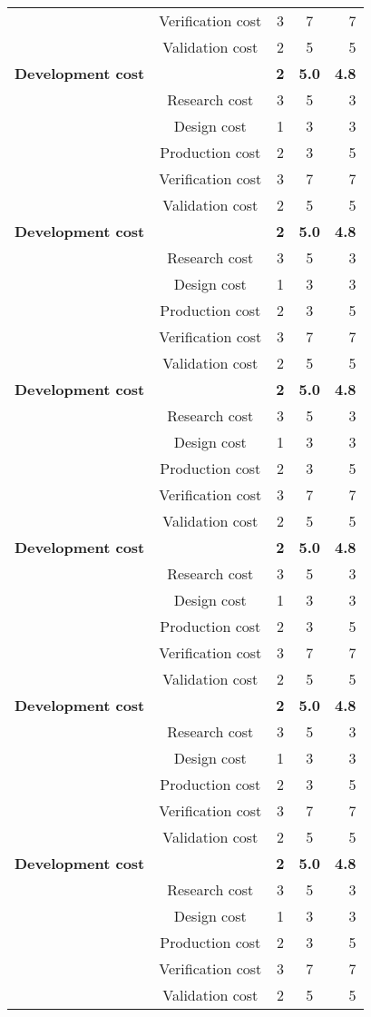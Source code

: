 \begin{center}
\begin{scriptsize}
\begin{longtable}[c]{lcccr}
  & Verification cost & 3 & 7 & 7 \\
  & Validation cost & 2 & 5 & 5 \\
  \textbf{Development cost} & & \textbf{2} & \textbf{5.0} & \textbf{4.8} \\
  & Research cost & 3 & 5 & 3 \\
  & Design cost & 1 & 3 & 3 \\
  & Production cost & 2 & 3 & 5 \\
  & Verification cost & 3 & 7 & 7 \\
  & Validation cost & 2 & 5 & 5 \\
  \textbf{Development cost} & & \textbf{2} & \textbf{5.0} & \textbf{4.8} \\
  & Research cost & 3 & 5 & 3 \\
  & Design cost & 1 & 3 & 3 \\
  & Production cost & 2 & 3 & 5 \\
  & Verification cost & 3 & 7 & 7 \\
  & Validation cost & 2 & 5 & 5 \\
  \textbf{Development cost} & & \textbf{2} & \textbf{5.0} & \textbf{4.8} \\
  & Research cost & 3 & 5 & 3 \\
  & Design cost & 1 & 3 & 3 \\
  & Production cost & 2 & 3 & 5 \\
  & Verification cost & 3 & 7 & 7 \\
  & Validation cost & 2 & 5 & 5 \\
  \textbf{Development cost} & & \textbf{2} & \textbf{5.0} & \textbf{4.8} \\
  & Research cost & 3 & 5 & 3 \\
  & Design cost & 1 & 3 & 3 \\
  & Production cost & 2 & 3 & 5 \\
  & Verification cost & 3 & 7 & 7 \\
  & Validation cost & 2 & 5 & 5 \\
  \textbf{Development cost} & & \textbf{2} & \textbf{5.0} & \textbf{4.8} \\
  & Research cost & 3 & 5 & 3 \\
  & Design cost & 1 & 3 & 3 \\
  & Production cost & 2 & 3 & 5 \\
  & Verification cost & 3 & 7 & 7 \\
  & Validation cost & 2 & 5 & 5 \\
  \textbf{Development cost} & & \textbf{2} & \textbf{5.0} & \textbf{4.8} \\
  & Research cost & 3 & 5 & 3 \\
  & Design cost & 1 & 3 & 3 \\
  & Production cost & 2 & 3 & 5 \\
  & Verification cost & 3 & 7 & 7 \\
  & Validation cost & 2 & 5 & 5 \\
 \end{longtable}
 \end{scriptsize}
\end{center}